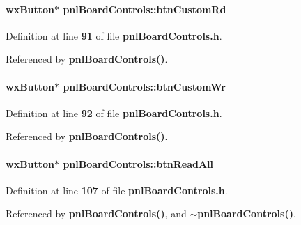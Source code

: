 \paragraph[{btn\+Custom\+Rd}]{\setlength{\rightskip}{0pt plus 5cm}wx\+Button$\ast$ pnl\+Board\+Controls\+::btn\+Custom\+Rd\hspace{0.3cm}{\ttfamily [protected]}}\label{classpnlBoardControls_aa5516294f004d80aeabd714b86c8520a}


Definition at line {\bf 91} of file {\bf pnl\+Board\+Controls.\+h}.



Referenced by {\bf pnl\+Board\+Controls()}.

\paragraph[{btn\+Custom\+Wr}]{\setlength{\rightskip}{0pt plus 5cm}wx\+Button$\ast$ pnl\+Board\+Controls\+::btn\+Custom\+Wr\hspace{0.3cm}{\ttfamily [protected]}}\label{classpnlBoardControls_a18b58594870fd2ce5ce01901dacbe1f8}


Definition at line {\bf 92} of file {\bf pnl\+Board\+Controls.\+h}.



Referenced by {\bf pnl\+Board\+Controls()}.

\paragraph[{btn\+Read\+All}]{\setlength{\rightskip}{0pt plus 5cm}wx\+Button$\ast$ pnl\+Board\+Controls\+::btn\+Read\+All\hspace{0.3cm}{\ttfamily [protected]}}\label{classpnlBoardControls_a770efa56a439c85b80cb445fcd2dadae}


Definition at line {\bf 107} of file {\bf pnl\+Board\+Controls.\+h}.



Referenced by {\bf pnl\+Board\+Controls()}, and {\bf $\sim$pnl\+Board\+Controls()}.

